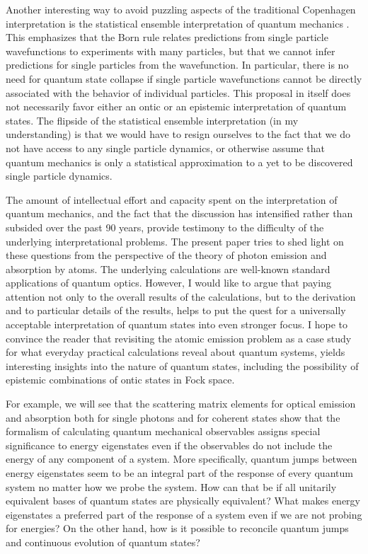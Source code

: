 \documentclass[final,3p,times,twocolumn]{elsarticle3}
\begin{document}
Another interesting way to avoid puzzling aspects of the traditional Copenhagen 
interpretation is the statistical ensemble interpretation of quantum 
mechanics \cite{ballentine1,ballentine2}. This emphasizes that the Born rule 
relates predictions from single particle wavefunctions to experiments with many 
particles, but that we cannot infer predictions for single particles from the 
wavefunction. In particular, there is no need for quantum state collapse if 
single particle wavefunctions cannot be directly associated with the behavior 
of individual particles. This proposal in itself does not necessarily favor either 
an ontic or an epistemic interpretation of quantum states. The flipside of the 
statistical ensemble interpretation (in my understanding) is that we would have 
to resign ourselves to the fact that we do not have access to any single particle 
dynamics, or otherwise assume that quantum mechanics is only a statistical 
approximation to a yet to be discovered single particle dynamics. 

The amount of intellectual effort and capacity spent on the interpretation of 
quantum mechanics, and the fact that the discussion has intensified rather than 
subsided over the past 90 years, provide testimony to the difficulty of the 
underlying interpretational problems. The present paper tries to shed light on 
these questions from the perspective of the theory of photon emission and 
absorption by atoms. The underlying calculations are well-known standard 
applications of quantum optics. However, I would like to argue that paying 
attention not only to the overall results of the calculations, but to the
derivation and to particular details of the results, helps to put the 
quest for a universally acceptable interpretation of quantum states into 
even stronger focus. I hope to convince the reader that revisiting the atomic 
emission problem as a case study for what everyday practical calculations reveal 
about quantum systems, yields interesting insights into the nature of quantum 
states, including the possibility of epistemic combinations of ontic states 
in Fock space.

 For example, we will see that the scattering matrix elements for optical 
emission and absorption both for single photons and for coherent states
show that the formalism of calculating quantum mechanical observables 
assigns special significance to energy eigenstates even if the observables
do not include the energy of any component of a system. More specifically,
quantum jumps between energy eigenstates seem to be an integral part of the 
response of every quantum system no matter how we probe the system.
How can that be if all unitarily equivalent bases of quantum states are
physically equivalent? What makes energy eigenstates a preferred part of
the response of a system even if we are not probing for energies?
On the other hand, how is it possible to reconcile quantum jumps 
and continuous evolution of quantum states?
\end{document}
